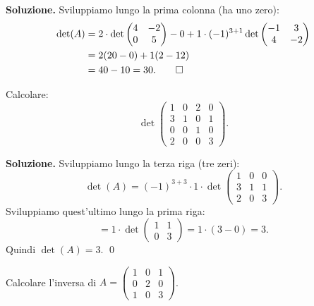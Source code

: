 \textbf{Soluzione.} Sviluppiamo lungo la prima colonna (ha uno zero):
\begin{align*}
    \det(A) &= 2 \cdot \det\begin{pmatrix} 4 & -2 \\ 0 & 5 \end{pmatrix} - 0 + 1 \cdot (-1)^{3+1}\det\begin{pmatrix} -1 & 3 \\ 4 & -2 \end{pmatrix} \\
    &= 2(20 - 0) + 1(2 - 12) \\
    &= 40 - 10 = 30. \qed
\end{align*}

\medskip

\begin{examplebox}
Calcolare:
\[ \det\begin{pmatrix} 1 & 0 & 2 & 0 \\ 3 & 1 & 0 & 1 \\ 0 & 0 & 1 & 0 \\ 2 & 0 & 0 & 3 \end{pmatrix}. \]
\end{examplebox}

\textbf{Soluzione.} Sviluppiamo lungo la terza riga (tre zeri):
\[ \det(A) = (-1)^{3+3} \cdot 1 \cdot \det\begin{pmatrix} 1 & 0 & 0 \\ 3 & 1 & 1 \\ 2 & 0 & 3 \end{pmatrix}. \]
Sviluppiamo quest'ultimo lungo la prima riga:
\[ = 1 \cdot \det\begin{pmatrix} 1 & 1 \\ 0 & 3 \end{pmatrix} = 1 \cdot (3 - 0) = 3. \]
Quindi $\det(A) = 3$. \qed

\medskip

\begin{examplebox}
Calcolare l'inversa di $A = \begin{pmatrix} 1 & 0 & 1 \\ 0 & 2 & 0 \\ 1 & 0 & 3 \end{pmatrix}$.
\end{examplebox}

